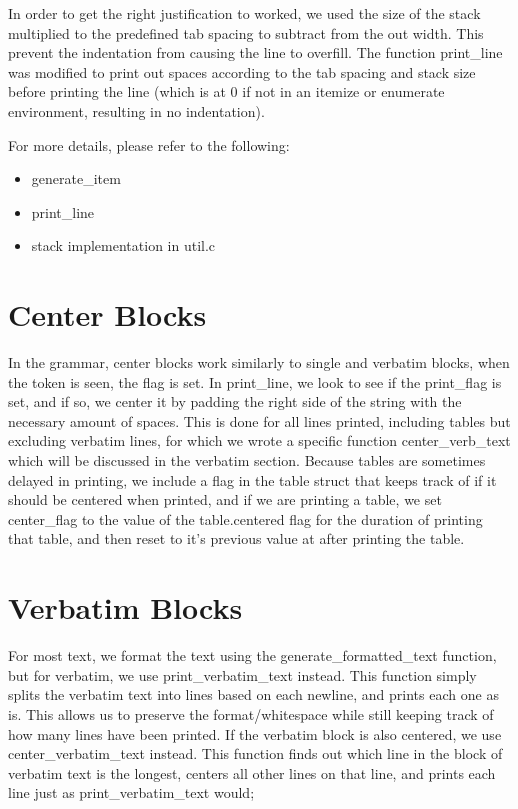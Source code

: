 In order to get the right justification to worked, we used the size of the stack multiplied
to the predefined tab spacing to subtract from the out width. This prevent the indentation
from causing the line to overfill. The function print_line was modified to print out spaces
according to the tab spacing and stack size before printing the line (which is at 0 if not
in an itemize or enumerate environment, resulting in no indentation).

For more details, please refer to the following:
\begin{itemize}
\item generate_item
\item print_line
\item stack implementation in util.c
\end{itemize}

\section{Center Blocks}
In the grammar, center blocks work similarly to single and verbatim blocks, when the token is seen, the flag is set. In print_line, we look to see if the print_flag is set, and if so, we center it by padding the right side of the string with the necessary amount of spaces. This is done for all lines printed, including tables but excluding verbatim lines, for which we wrote a specific function center_verb_text which will be discussed in the verbatim section. Because tables are sometimes delayed in printing, we include a flag in the table struct that keeps track of if it should be centered when printed, and if we are printing a table, we set center_flag to the value of the table.centered flag for the duration of printing that table, and then reset to it's previous value at after printing the table.

\section{Verbatim Blocks}
For most text, we format the text using the generate_formatted_text function, but for verbatim, we use print_verbatim_text instead. This function simply splits the verbatim text into lines based on each newline, and prints each one as is. This allows us to preserve the format/whitespace while still keeping track of how many lines have been printed. If the verbatim block is also centered, we use center_verbatim_text instead. This function finds out which line in the block of verbatim text is the longest, centers all other lines on that line, and prints each line just as print_verbatim_text would;

